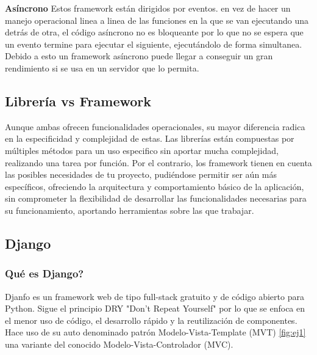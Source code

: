\textbf{Asíncrono}
\newline
Estos framework están dirigidos por eventos. en vez de hacer un manejo operacional linea a linea de las funciones en la que se van ejecutando una detrás de otra, el código asíncrono no es bloqueante por lo que no se espera que un evento termine para ejecutar el siguiente, ejecutándolo de forma simultanea. Debido a esto un framework asíncrono puede llegar a conseguir un gran rendimiento si se usa en un servidor que lo permita.

\subsection{Librería vs Framework}
Aunque ambas ofrecen funcionalidades operacionales, su mayor diferencia radica en la especificidad y complejidad de estas.
\newline
\newline
Las librerías están compuestas por múltiples métodos para un uso especifico sin aportar mucha complejidad, realizando una tarea por función.
\newline
\newline
Por el contrario, los framework tienen en cuenta las posibles necesidades de tu proyecto, pudiéndose permitir ser aún más específicos, ofreciendo la arquitectura y comportamiento básico de la aplicación, sin comprometer la flexibilidad de desarrollar las funcionalidades necesarias para su funcionamiento, aportando herramientas sobre las que trabajar. \cite{glez2014web}

\subsection{Django}

\subsubsection{Qué es Django?}
Djanfo es un framework web de tipo full-stack gratuito y de código abierto para Python. Sigue el principio DRY "Don’t Repeat Yourself" por lo que se enfoca en el menor uso de código, el desarrollo rápido y la reutilización de componentes. \cite{DjDF} \cite{alchin2013pro}
\newline
\newline
Hace uso de su auto denominado patrón Modelo-Vista-Template (MVT) \ref{fig:ej1} una variante del conocido Modelo-Vista-Controlador (MVC). \cite{ravindran2015django}

